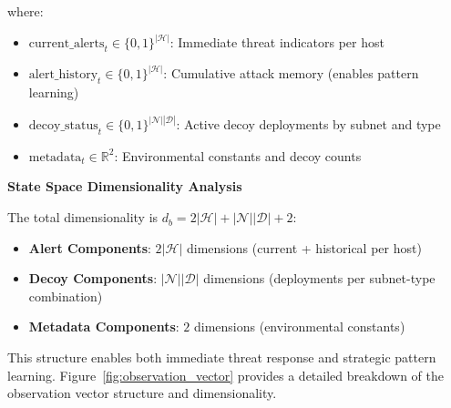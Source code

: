 \documentclass[12pt]{article}
\theoremstyle{definition}
\theoremstyle{plain}
\begin{document}
where:
\begin{itemize}
    \item $\text{current\_alerts}_t \in \{0,1\}^{|\mathcal{H}|}$: Immediate threat indicators per host
    \item $\text{alert\_history}_t \in \{0,1\}^{|\mathcal{H}|}$: Cumulative attack memory (enables pattern learning)
    \item $\text{decoy\_status}_t \in \{0,1\}^{|\mathcal{N}||\mathcal{D}|}$: Active decoy deployments by subnet and type
    \item $\text{metadata}_t \in \mathbb{R}^2$: Environmental constants and decoy counts
\end{itemize}

\textbf{State Space Dimensionality Analysis}

The total dimensionality is $d_b = 2|\mathcal{H}| + |\mathcal{N}||\mathcal{D}| + 2$:

\begin{itemize}
\item \textbf{Alert Components}: $2|\mathcal{H}|$ dimensions (current + historical per host)
\item \textbf{Decoy Components}: $|\mathcal{N}||\mathcal{D}|$ dimensions (deployments per subnet-type combination)  
\item \textbf{Metadata Components}: $2$ dimensions (environmental constants)
\end{itemize}

This structure enables both immediate threat response and strategic pattern learning. Figure~\ref{fig:observation_vector} provides a detailed breakdown of the observation vector structure and dimensionality.
\end{document}
